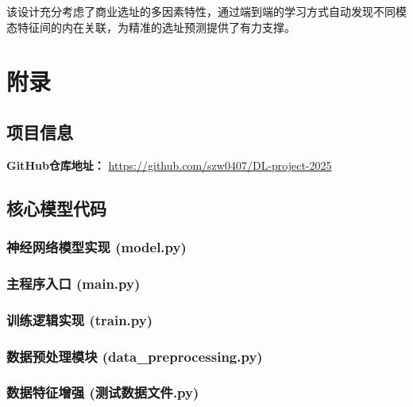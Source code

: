 \documentclass{article}
\begin{document}
该设计充分考虑了商业选址的多因素特性，通过端到端的学习方式自动发现不同模态特征间的内在关联，为精准的选址预测提供了有力支撑。


\appendix
\section{附录}

\subsection{项目信息}
\textbf{GitHub仓库地址：} \url{https://github.com/szw0407/DL-project-2025}

\subsection{核心模型代码}
\subsubsection{神经网络模型实现 (model.py)}


\subsubsection{主程序入口 (main.py)}


\subsubsection{训练逻辑实现 (train.py)}


\subsubsection{数据预处理模块 (data\_preprocessing.py)}


\subsubsection{数据特征增强 (测试数据文件.py)}

\end{document}
